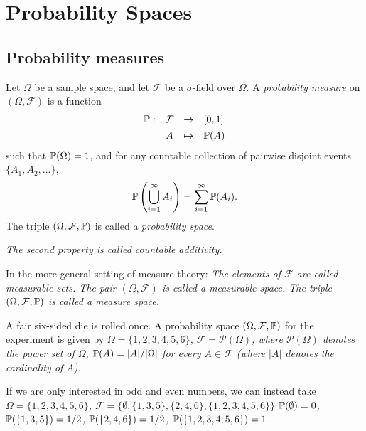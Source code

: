 \chapter{Probability Spaces}\label{chap:probability}
\section{Probability measures}

\begin{definition}
Let $\Omega$ be a sample space, and let $\mathcal{F}$ be a $\sigma$-field over $\Omega$. A \emph{probability measure} on $(\Omega,\mathcal{F})$ is a function 
\[
\begin{array}{rccl}
	\mathbb{P}:	& \mathcal{F}	& \to	& [0,1] \\[1ex]
			& A				& \mapsto	& \mathbb{P}(A)
\end{array}
\]
such that $\mathbb{P}(\Omega) = 1$, and for any countable collection of pairwise disjoint events $\{A_1,A_2,\ldots\}$,
\[
\mathbb{P}\left(\bigcup_{i=1}^\infty A_i\right) = \sum_{i=1}^{\infty} \mathbb{P}(A_i).
\]
The triple $(\Omega,\mathcal{F},\mathbb{P})$ is called a \emph{probability space}.
\end{definition}

\begin{remark}
\bit
\it The second property is called \emph{countable additivity}.
\eit
\end{remark}

\begin{remark}
In the more general setting of measure theory:
\bit
\it The elements of $\mathcal{F}$ are called \emph{measurable sets}.	
\it The pair $(\Omega,\mathcal{F})$ is called a \emph{measurable space}.
\it The triple $(\Omega,\mathcal{F},\mathbb{P})$ is called a \emph{measure space}.
\eit
\end{remark}

\begin{example}
A fair six-sided die is rolled once. 
\spar
A probability space $(\Omega,\mathcal{F}, \mathbb{P})$ for the experiment is given by
\bit
\it $\Omega=\{1,2,3,4,5,6\}$,
\it $\mathcal{F} = \mathcal{P}(\Omega)$, where $\mathcal{P}(\Omega)$ denotes the power set of $\Omega$,
\it $\mathbb{P}(A)=|A|/|\Omega|$ for every $A\in\mathcal{F}$ (where $|A|$ denotes the cardinality of $A$).
\eit

If we are only interested in odd and even numbers, we can instead take
\bit
\it $\Omega=\{1,2,3,4,5,6\}$,
\it $\mathcal{F} = \big\{\emptyset,\{1,3,5\},\{2,4,6\},\{1,2,3,4,5,6\}\big\}$
\it $\mathbb{P}(\emptyset)=0$, $\mathbb{P}(\{1,3,5\})=1/2$, $\mathbb{P}(\{2,4,6\})=1/2$, $\mathbb{P}(\{1,2,3,4,5,6\})=1$.
\eit
\end{example}

